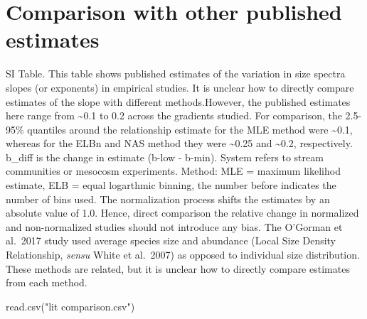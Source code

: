 \documentclass[
]{article}
\newenvironment{Shaded}{\begin{snugshade}}{\end{snugshade}}
\newcommand{\FunctionTok}[1]{\textcolor[rgb]{0.00,0.00,0.00}{#1}}
\newcommand{\NormalTok}[1]{#1}
\newcommand{\StringTok}[1]{\textcolor[rgb]{0.31,0.60,0.02}{#1}}
\begin{document}
\hypertarget{comparison-with-other-published-estimates}{%
\section{Comparison with other published
estimates}\label{comparison-with-other-published-estimates}}

SI Table. This table shows published estimates of the variation in size
spectra slopes (or exponents) in empirical studies. It is unclear how to
directly compare estimates of the slope with different methods.However,
the published estimates here range from \textasciitilde0.1 to 0.2 across
the gradients studied. For comparison, the 2.5-95\% quantiles around the
relationship estimate for the MLE method were \textasciitilde0.1,
whereas for the ELBn and NAS method they were \textasciitilde0.25 and
\textasciitilde0.2, respectively. b\_diff is the change in estimate
(b-low - b-min). System refers to stream communities or mesocosm
experiments. Method: MLE = maximum likelihod estimate, ELB = equal
logarthmic binning, the number before indicates the number of bins used.
The normalization process shifts the estimates by an absolute value of
1.0. Hence, direct comparison the relative change in normalized and
non-normalized studies should not introduce any bias. The O'Gorman et
al.~2017 study used average species size and abundance (Local Size
Density Relationship, \emph{sensu} White et al.~2007) as opposed to
individual size distribution. These methods are related, but it is
unclear how to directly compare estimates from each method.

\begin{Shaded}
\begin{Highlighting}[]
\FunctionTok{read.csv}\NormalTok{(}\StringTok{"lit comparison.csv"}\NormalTok{)}
\end{Highlighting}
\end{Shaded}
\end{document}
